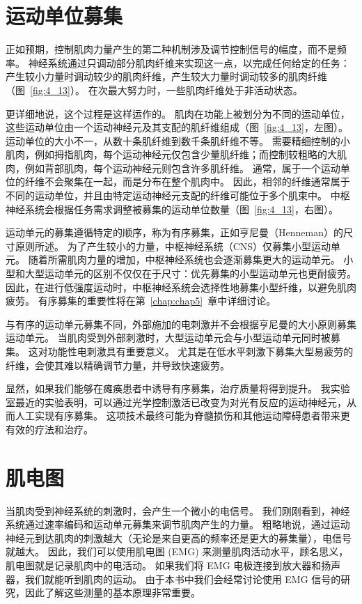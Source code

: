 \section{运动单位募集}

正如预期，控制肌肉力量产生的第二种机制涉及调节控制信号的幅度，而不是频率。
神经系统通过只调动部分肌肉纤维来实现这一点，以完成任何给定的任务：产生较小力量时调动较少的肌肉纤维，产生较大力量时调动较多的肌肉纤维（图~\ref{fig:4_13}）。
在次最大努力时，一些肌肉纤维处于非活动状态。


更详细地说，这个过程是这样运作的。
肌肉在功能上被划分为不同的运动单位，这些运动单位由一个运动神经元及其支配的肌纤维组成（图~\ref{fig:4_13}，左图）。
运动单位的大小不一，从数十条肌纤维到数千条肌纤维不等。
需要精细控制的小肌肉，例如拇指肌肉，每个运动神经元仅包含少量肌纤维；而控制较粗略的大肌肉，例如背部肌肉，每个运动神经元则包含许多肌纤维。
通常，属于一个运动单位的纤维不会聚集在一起，而是分布在整个肌肉中。
因此，相邻的纤维通常属于不同的运动单位，并且由特定运动神经元支配的纤维可能位于多个肌束中。
中枢神经系统会根据任务需求调整被募集的运动单位数量（图~\ref{fig:4_13}，右图）。


运动单元的募集遵循特定的顺序，称为有序募集，正如亨尼曼（Henneman）的尺寸原则\cite{henneman1965functional}所述。
为了产生较小的力量，中枢神经系统（CNS）仅募集小型运动单元。
随着所需肌肉力量的增加，中枢神经系统也会逐渐募集更大的运动单元。
小型和大型运动单元的区别不仅仅在于尺寸：优先募集的小型运动单元也更耐疲劳。
因此，在进行低强度运动时，中枢神经系统会选择性地募集小型纤维，以避免肌肉疲劳。
有序募集的重要性将在第~\ref{chap:chap5}~章中详细讨论。


与有序的运动单元募集不同，外部施加的电刺激并不会根据亨尼曼的大小原则募集运动单元。
当肌肉受到外部刺激时，大型运动单元会与小型运动单元同时被募集\cite{gregory2005recruitment}。
这对功能性电刺激具有重要意义。
尤其是在低水平刺激下募集大型易疲劳的纤维，会使其难以精确调节力量，并导致快速疲劳。


显然，如果我们能够在瘫痪患者中诱导有序募集，治疗质量将得到提升。
我实验室最近的实验表明，可以通过光学控制激活已改变为对光有反应的运动神经元，从而人工实现有序募集\cite{llewellyn2010orderly}。
这项技术最终可能为脊髓损伤和其他运动障碍患者带来更有效的疗法和治疗。



\section{肌电图}

当肌肉受到神经系统的刺激时，会产生一个微小的电信号。
我们刚刚看到，神经系统通过速率编码和运动单元募集来调节肌肉产生的力量。
粗略地说，通过运动神经元到达肌肉的刺激越大（无论是来自更高的频率还是更大的募集量），电信号就越大。
因此，我们可以使用肌电图 (EMG) 来测量肌肉活动水平，顾名思义，肌电图就是记录肌肉中的电活动。
如果我们将 EMG 电极连接到放大器和扬声器，我们就能听到肌肉的运动。
由于本书中我们会经常讨论使用 EMG 信号的研究，因此了解这些测量的基本原理非常重要。


